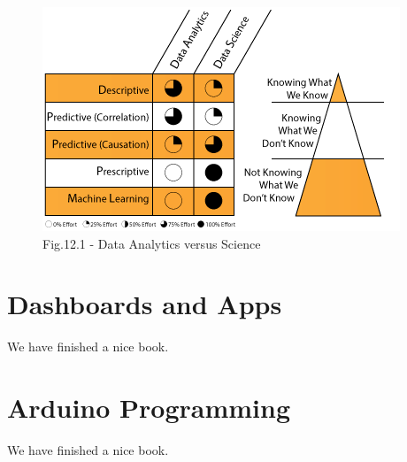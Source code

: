 \documentclass[]{book}
\theoremstyle{definition}
\theoremstyle{definition}
\theoremstyle{remark}
\begin{document}
\begin{figure}[htbp]
\centering
\includegraphics{./images/datascience.png}
\caption{Fig.12.1 - Data Analytics versus Science}
\end{figure}

\citep{j_data_2013}

\chapter{Dashboards and Apps}\label{apps}

We have finished a nice book.

\chapter{Arduino Programming}\label{arduino}

We have finished a nice book.


\end{document}
